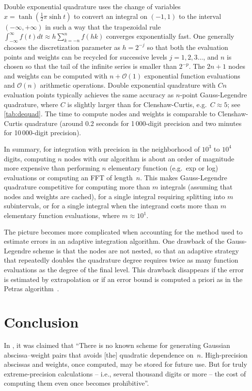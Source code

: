 \documentclass[nohypdvips,review]{siamart0216}
\newcommand{\OO}{\mathcal{O}}
\begin{document}
Double exponential quadrature uses the change of variables
$x = \tanh(\tfrac12 \pi \sinh t)$ to convert an integral on $(-1,1)$
to the interval $(-\infty,+\infty)$ in such a way that
the trapezoidal rule $\int_{-\infty}^{\infty} f(t) dt \approx h \sum_{k=-n}^{n} f(hk)$
converges exponentially fast.
One generally chooses the discretization parameter as $h = 2^{-j}$ so that
both the evaluation points and weights can be recycled for successive levels
$j = 1, 2, 3\ldots$, and $n$ is chosen so that the tail of the
infinite series is smaller than $2^{-p}$.
The $2n+1$ nodes and weights can be computed with $n + \OO(1)$
exponential function evaluations and $\OO(n)$ arithmetic operations.
Double exponential quadrature with $Cn$ evaluation points
typically achieves the same accuracy as $n$-point Gauss-Legendre quadrature,
where $C$ is slightly larger than
for Clenshaw-Curtis, e.g.\ $C \approx 5$; see \cref{tab:dequad}.
The time to compute nodes and weights is comparable
to Clenshaw-Curtis quadrature (around 0.2 seconds for 1\,000-digit
precision and two minutes for 10\,000-digit precision).

In summary, for integration
with precision in the neighborhood of $10^3$ to $10^4$ digits,
computing $n$ nodes with our algorithm is about an
order of magnitude more expensive than performing $n$ elementary function (e.g.\ exp or log)
evaluations or computing an FFT of length~$n$.
This makes Gauss-Legendre quadrature competitive for computing more than $m$
integrals (assuming that nodes and weights are cached),
for a single integral requiring splitting into $m$ subintervals,
or for a single integral when the integrand costs more than $m$ elementary
function evaluations, where $m \approx 10^1$.

The picture becomes more complicated when accounting for the method
used to estimate errors in an adaptive integration algorithm.
One drawback of the Gauss-Legendre scheme is that the nodes
are not nested, so that an adaptive strategy that
repeatedly doubles the quadrature degree
requires twice as many function evaluations as
the degree of the final level.
This drawback disappears if the
error is estimated by extrapolation or if an error bound is computed
a priori as in the Petras algorithm~\cite{petras2002self}.

\section{Conclusion}

In \cite{bailey2011high}, it was claimed that
``There is no known scheme for generating Gaussian abscissa--weight pairs
that avoids [the] quadratic dependence
on~$n$. High-precision abscissas
and weights, once computed, may be stored for future use. But for truly
extreme-precision calculations -- i.e., several thousand digits or
more -- the cost of computing them
even once becomes prohibitive''.
\end{document}
